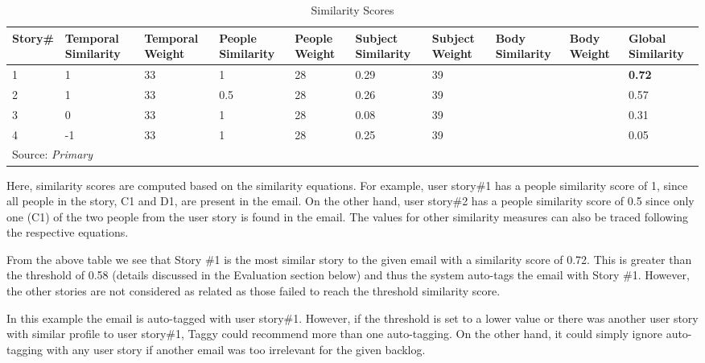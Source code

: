 \begin{table}
  \centering
  \caption{Similarity Scores}
    \begin{tabular}{|p{1.2cm}|p{1.5cm}|p{1.2cm}|p{1.5cm}|p{1.2cm}|p{1.5cm}|p{1.2cm}|p{1.2cm}|p{1.2cm}|p{1.2cm}|}
      	\hline
		\textbf{Story\#} & \textbf{Temporal Similarity} & \textbf{Temporal Weight} & \textbf{People Similarity} & \textbf{People Weight} & \textbf{Subject Similarity} &\textbf{Subject Weight} & \textbf{Body Similarity} &\textbf{Body Weight} &\textbf{Global Similarity}\\
		\hline
		1 & 1 	& 33 & 1 	& 28	& 0.29 & 39	& &	& \textbf{0.72}\\
		2 & 1 	& 33 & 0.5 	& 28 	& 0.26 & 39		& &	& 0.57\\
		3 & 0 	& 33 & 1 	& 28	& 0.08 & 39			& & & 0.31\\
		4 & -1 	& 33 & 1 	& 28	& 0.25 & 39			& & & 0.05\\
		\hline
        \multicolumn{10}{l}{Source: \emph{Primary}}
	\end{tabular}
	\label{tab:similarity}
\end{table}  

Here, similarity scores are computed based on the similarity equations. For example, user story\#1 has a people similarity score of 1, since all people in the story, C1 and D1, are present in the email. On the other hand, user story\#2 has a people similarity score of 0.5 since only one (C1) of the two people from the user story is found in the email. The values for other similarity measures can also be traced following the respective equations.

From the above table we see that Story \#1 is the most similar story to the given email with a similarity score of 0.72. This is greater than the threshold of 0.58 (details discussed in the Evaluation section below) and thus the system auto-tags the email with Story \#1. However, the other stories are not considered as related as those failed to reach the threshold similarity score.

In this example the email is auto-tagged with user story\#1. However, if the threshold is set to a lower value or there was another user story with similar profile to user story\#1, Taggy could recommend more than one auto-tagging. On the other hand, it could simply ignore auto-tagging with any user story if another email was too irrelevant for the given backlog.


